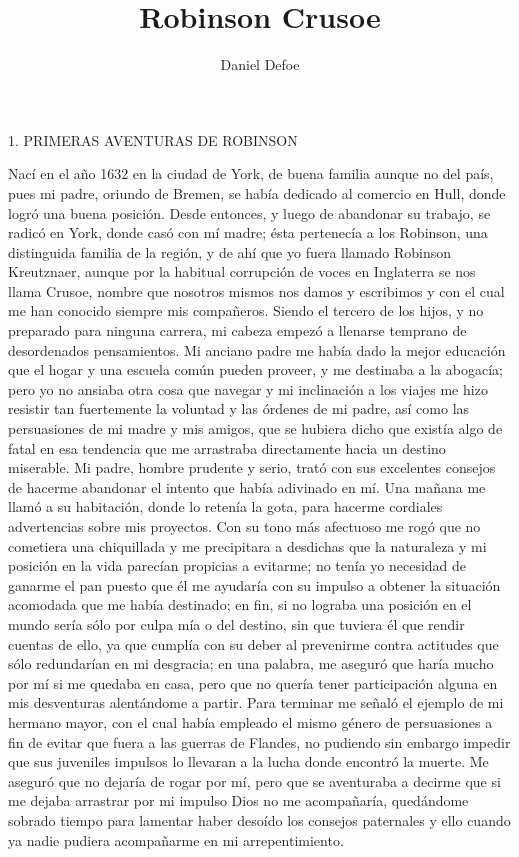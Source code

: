 \documentclass{novela}
\title{Robinson Crusoe}
\author{Daniel Defoe}
\date{}
\begin{document}
	\maketitle
	\tableofcontents
    1. PRIMERAS AVENTURAS DE ROBINSON

    Nací en el año 1632 en la ciudad de York, de buena familia aunque no del país, pues mi padre, oriundo de Bremen, se había dedicado al comercio en Hull, donde logró una buena posición. Desde entonces, y luego de abandonar su trabajo, se radicó en York, donde casó con mí madre; ésta pertenecía a los Robinson, una distinguida familia de la región, y de ahí que yo fuera llamado Robinson Kreutznaer, aunque por la habitual corrupción de voces en Inglaterra se nos llama Crusoe, nombre que nosotros mismos nos damos y escribimos y con el cual me han conocido siempre mis compañeros.
    Siendo el tercero de los hijos, y no preparado para ninguna carrera, mi cabeza empezó a llenarse temprano de desordenados pensamientos. Mi anciano padre me había dado la mejor educación que el hogar y una escuela común pueden proveer, y me destinaba a la abogacía; pero yo no ansiaba otra cosa que navegar y mi inclinación a los viajes me hizo resistir tan fuertemente la voluntad y las órdenes de mi padre, así como las persuasiones de mi madre y mis amigos, que se hubiera dicho que existía algo de fatal en esa tendencia que me arrastraba directamente hacia un destino miserable.
    Mi padre, hombre prudente y serio, trató con sus excelentes consejos de hacerme abandonar el intento que había adivinado en mí. Una mañana me llamó a su habitación, donde lo retenía la gota, para hacerme cordiales advertencias sobre mis proyectos. Con su tono más afectuoso me rogó que no cometiera una chiquillada y me precipitara a desdichas que la naturaleza y mi posición en la vida parecían propicias a evitarme; no tenía yo necesidad de ganarme el pan puesto que él me ayudaría con su impulso a obtener la situación acomodada que me había destinado; en fin, si no lograba una posición en el mundo sería sólo por culpa mía o del destino, sin que tuviera él que rendir cuentas de ello, ya que cumplía con su deber al prevenirme contra actitudes que sólo redundarían en mi desgracia; en una palabra, me aseguró que haría mucho por mí si me quedaba en casa, pero que no quería tener participación alguna en mis desventuras alentándome a partir. Para terminar me señaló el ejemplo de mi hermano mayor, con el cual había empleado el mismo género de persuasiones a fin de evitar que fuera a las guerras de Flandes, no pudiendo sin embargo impedir que sus juveniles impulsos lo llevaran a la lucha donde encontró la muerte. Me aseguró que no dejaría de rogar por mí, pero que se aventuraba a decirme que si me dejaba arrastrar por mi impulso Dios no me acompañaría, quedándome sobrado tiempo para lamentar haber desoído los consejos paternales y ello cuando ya nadie pudiera acompañarme en mi arrepentimiento.
\end{document}
